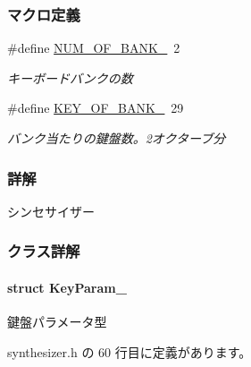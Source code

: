 \subsubsection*{マクロ定義}
\begin{DoxyCompactItemize}
\item 
\#define \hyperlink{synthesizer_8h_aa49d37848f9e48ae5be1e7e87d2abcc3_aa49d37848f9e48ae5be1e7e87d2abcc3}{N\+U\+M\+\_\+\+O\+F\+\_\+\+B\+A\+N\+K\+\_\+}~2
\begin{DoxyCompactList}\small\item\em キーボードバンクの数 \end{DoxyCompactList}\item 
\#define \hyperlink{synthesizer_8h_a19965f59d417acca89a01d9063731c50_a19965f59d417acca89a01d9063731c50}{K\+E\+Y\+\_\+\+O\+F\+\_\+\+B\+A\+N\+K\+\_\+}~29
\begin{DoxyCompactList}\small\item\em バンク当たりの鍵盤数。2オクターブ分 \end{DoxyCompactList}\end{DoxyCompactItemize}


\subsubsection{詳解}
シンセサイザー 

 

\subsubsection{クラス詳解}
\label{structKeyParam__}
\paragraph{struct Key\+Param\+\_\+}
鍵盤パラメータ型 

 synthesizer.\+h の 60 行目に定義があります。



